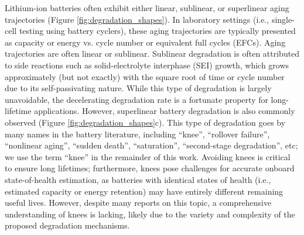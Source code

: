 \documentclass[journal=jpclcd,manuscript=article]{achemso}
\begin{document}
Lithium-ion batteries often exhibit either linear, sublinear, or superlinear aging trajectories (Figure \ref{fig:degradation_shapes}). In laboratory settings (i.e., single-cell testing using battery cyclers), these aging trajectories are typically presented as capacity or energy vs. cycle number or equivalent full cycles (EFCs). Aging trajectories are often linear\cite{ma_editors_2019, keil_electrochemical_2020, keil_electrochemical_2020,  preger_degradation_2020} or sublinear\cite{bloom_accelerated_2001, broussely_aging_2001, wright_calendar-_2002, smith_high_2011, attia_revisiting_2020}. Sublinear degradation is often attributed to side reactions such as solid-electrolyte interphase (SEI) growth, which grows approximately\cite{bloom_accelerated_2001, broussely_aging_2001, wright_calendar-_2002, smith_high_2011} (but not exactly\cite{attia_revisiting_2020}) with the square root of time or cycle number due to its self-passivating nature. While this type of degradation is largely unavoidable, the decelerating degradation rate is a fortunate property for long-lifetime applications. However, superlinear battery degradation is also commonly observed (Figure \ref{fig:degradation_shapes}c). This type of degradation goes by many names in the battery literature, including ``knee''\cite{diao_algorithm_2019, fermin-cueto_identification_2020}, ``rollover failure''\cite{ma_editors_2019}, ``nonlinear aging''\cite{schuster_nonlinear_2015, bach_nonlinear_2016, yang_modeling_2017, mandli_analysis_2019, keil_linear_2019, keil_electrochemical_2020, atalay_theory_2020}, ``sudden death''\cite{muller_model-based_2019, willenberg_development_2020}, ``saturation''\cite{lin_comprehensive_2013}, ``second-stage degradation''\cite{dubarry_perspective_2020}, etc; we use the term ``knee'' in the remainder of this work. Avoiding knees is critical to ensure long lifetimes; furthermore, knees pose challenges for accurate onboard state-of-health estimation, as batteries with identical states of health (i.e., estimated capacity or energy retention) may have entirely different remaining useful lives\cite{dubarry_perspective_2020}. However, despite many reports on this topic, a comprehensive understanding of knees is lacking, likely due to the variety and complexity of the proposed degradation mechanisms.
\end{document}
